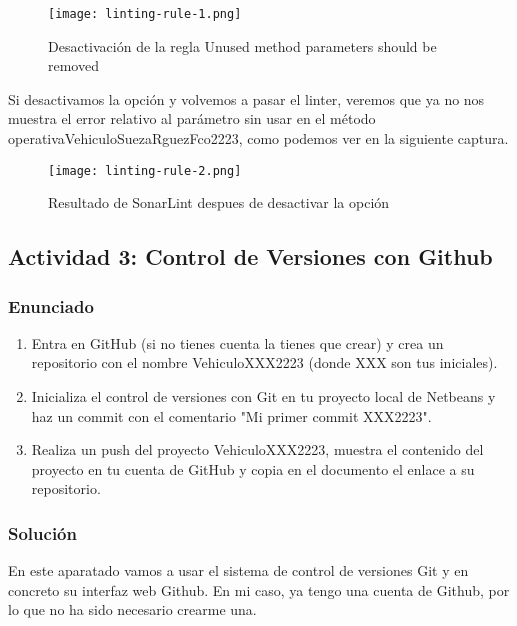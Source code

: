 \begin{itemize}
    \begin{figure}[H]
        \centering
        \texttt{[image: linting-rule-1.png]}
        \caption{Desactivación de la regla Unused method parameters should be removed}
    \end{figure}

    Si desactivamos la opción y volvemos a pasar el linter, veremos que ya no nos muestra el error relativo al parámetro sin usar en el método operativaVehiculoSuezaRguezFco2223, como podemos ver en la siguiente captura.

        \begin{figure}[H]
        \centering
        \texttt{[image: linting-rule-2.png]}
        \caption{Resultado de SonarLint despues de desactivar la opción}
    \end{figure}
\end{itemize}

\subsection{Actividad 3: Control de Versiones con Github}
\subsubsection{Enunciado}
\begin{enumerate}
    \item Entra en GitHub (si no tienes cuenta la tienes que crear) y crea un repositorio con el nombre VehiculoXXX2223 (donde XXX son tus iniciales).

    \item Inicializa el control de versiones con Git en tu proyecto local de Netbeans y haz un commit con el comentario "Mi primer commit XXX2223".

    \item Realiza un push del proyecto VehiculoXXX2223, muestra el contenido del proyecto en tu cuenta de GitHub y copia en el documento el enlace a su repositorio.
\end{enumerate}

\subsubsection{Solución}
En este aparatado vamos a usar el sistema de control de versiones Git y en concreto su interfaz web Github. En mi caso, ya tengo una cuenta de Github, por lo que no ha sido necesario crearme una.

